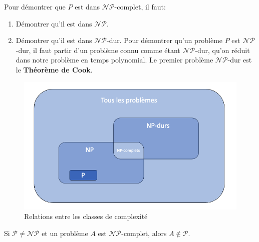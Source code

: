 Pour démontrer que $P$ est dans $\mathcal{NP}$-complet, il faut:
\begin{enumerate}
    \item Démontrer qu'il est dans $\mathcal{NP}$.
    \item Démontrer qu'il est dans $\mathcal{NP}$-dur. Pour démontrer qu'un problème $P$ est $\mathcal{NP}$-dur, il faut
    partir d'un problème connu comme étant $\mathcal{NP}$-dur, qu'on réduit dans notre problème en temps polynomial. Le 
    premier problème $\mathcal{NP}$-dur est le \textbf{Théorème de Cook}.
\end{enumerate}
\begin{figure}[H]
    \centering
    \includegraphics[scale=0.3]{pictures/NP.png}
    \caption{Relations entre les classes de complexité}
\end{figure}
\begin{theorem}{}{} 
    Si $\mathcal{P}\neq\mathcal{NP}$ et un problème $A$ est $\mathcal{NP}$-complet, alors $A\notin \mathcal{P}$.
\end{theorem}
